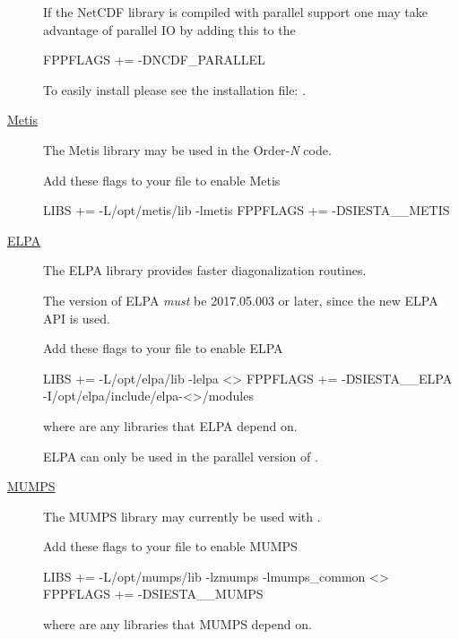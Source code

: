 \begin{description}
  
  If the NetCDF library is compiled with parallel support one may
  take advantage of parallel IO by adding this to the  
\begin{shellexample}
  FPPFLAGS += -DNCDF_PARALLEL
\end{shellexample}

  To easily install  please see the installation file:
  .


  \item[\href{http://glaros.dtc.umn.edu/gkhome/metis/metis/overview}{Metis}]%
  The Metis library may be used in the Order-\emph N code. 

  Add these flags to your  file to enable Metis
\begin{shellexample}
  LIBS += -L/opt/metis/lib -lmetis
  FPPFLAGS += -DSIESTA__METIS
\end{shellexample}

  
  \item[\href{http://elpa.mpcdf.mpg.de}{ELPA}]%
  The ELPA\cite{ELPA,ELPA-1} library provides faster diagonalization routines.

  The version of ELPA \emph{must} be 2017.05.003 or later, since the
  new ELPA API is used. 
  
  Add these flags to your  file to enable ELPA
\begin{shellexample}
  LIBS += -L/opt/elpa/lib -lelpa <>
  FPPFLAGS += -DSIESTA__ELPA -I/opt/elpa/include/elpa-<>/modules
\end{shellexample}
  where \shell{<>} are any libraries that ELPA depend on.

  \note ELPA can only be used in the parallel version of \siesta.

  
  \item[\href{http://mumps.enseeiht.fr}{MUMPS}]%
  The MUMPS library may currently be used with \tsiesta.
  
  Add these flags to your  file to enable MUMPS
\begin{shellexample}
  LIBS += -L/opt/mumps/lib -lzmumps -lmumps_common <>
  FPPFLAGS += -DSIESTA__MUMPS
\end{shellexample}
  where \shell{<>} are any libraries that MUMPS depend on.



\end{description}
